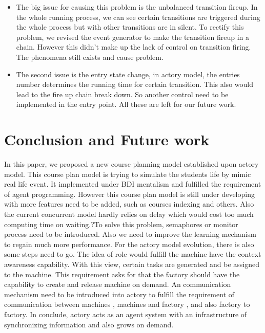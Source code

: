 \documentclass{sig-alternate}
\begin{document}
\begin{itemize}
\item
The big issue for causing this problem is the unbalanced transition fireup. In the whole running process, we can see certain transitions are triggered during the whole process but with other transitions are in silent.  To rectify this problem, we revised the event generator to make the transition fireup in a chain. However this didn't make up the lack of control on transition firing.  The phenomena still exists and cause problem. \\
\item
The second issue is the entry state change, in actory model, the entries number determines the running time for certain transition. This also would lead to the fire up chain break down.  So another control need to be implemented in the entry point. All these are left for our future work. \\
\end{itemize}

\section{Conclusion and Future work}
In this paper, we proposed a new course planning model established upon actory model.  This course plan model is trying to simulate the students life by mimic real life event.  It implemented under BDI mentalism and fulfilled the requirement of agent programming. However 
this course plan model is still under developing with more features need to be added, such as courses indexing and others.   Also the current concurrent model hardly relies on delay which would cost too much computing time on waiting.?To solve this problem, semaphores or monitor process need to be introduced.  Also we need to improve the learning mechanism to regain much more performance.  For the actory model evolution, there is also some steps need to go.   The idea of role would fulfill the machine have the context awareness capability.   With this view, certain tasks are generated and be assigned to the machine.  This requirement asks for that  the factory should have the capability to create and release machine on demand.   An communication mechanism need to be introduced into actory to fulfill the requirement of communication between machines , machines and factory , and also factory to factory.   In conclude, actory acts as an agent system with an infrastructure of synchronizing information and also grows on demand. 
\newpage


\end{document}
